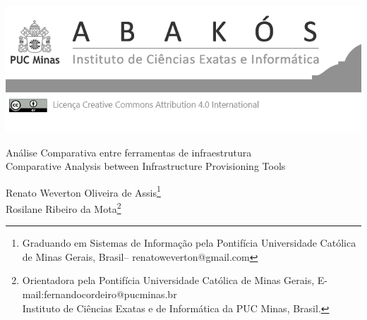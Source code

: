 \documentclass[a4paper,12pt,Times]{article}
\makeatletter
\newcommand{\monog}{Análise Comparativa entre ferramentas de infraestrutura}
\newcommand{\monogES}{Comparative Analysis between Infrastructure Provisioning Tools}
\newcommand{\origem}{Brasil}
\newcommand{\AutorA}{Renato Weverton Oliveira de Assis}
\newcommand{\funcaoA}{Graduando em Sistemas de Informação pela}
\newcommand{\emailA}{renatoweverton@gmail.com}
\newcommand{\cursA}{ Pontifícia Universidade Católica de Minas Gerais}
\newcommand{\AutorB}{Rosilane Ribeiro da Mota}
\newcommand{\funcaoB}{Orientadora pela Pontifícia Universidade Católica de Minas Gerais}
\newcommand{\emailB}{fernandocordeiro@pucminas.br}
\newcommand{\cursB}{Instituto de Ciências Exatas e de Informática da PUC Minas}
\newcommand{\keyword}[1]{\textsf{#1}}
\makeatother
\begin{document}

\begin{flushleft}

\begin{minipage} [c][5cm][b]{16.5cm} %
\includegraphics[scale=1.1]{figuras/pucmg.png} 
\end{minipage}

 \vspace{0cm} {
 \singlespacing \Large{\monog {} \\ }
  \normalsize{\monogES}
 }
\end{flushleft}
\begin{flushright}
\singlespacing 
\normalsize{\AutorA \footnote{\funcaoA \cursA, \origem -- \emailA }} \\
\normalsize{\AutorB \footnote{\funcaoB, E-mail:\emailB \\ \cursB, \origem. }} \\
\end{flushright}
\thispagestyle{empty}

\begin{abstract}
\noindent
   Infraestrutura como código, ou também conhecido como IaC é o gerenciamento de recursos em um ambiente computacional. Este gerenciamento é dado por meio de arquivos de definição para definir e implantar recursos, utilizando \textit{softwares} específicos para essa finalidade. A infraestrutura como código é adotada primordialmente na computação em nuvem permitindo um fluxo de trabalho totalmente automatizado. 
    Este trabalho trata-se de uma análise de ferramentas de provisionamento e gerenciamento de configuração.  
\\\textbf{\keyword{Palavras-chave: }}  Infraestrutura como código,Automação, Provisionamento,  Gerenciamento de configuração, Computação na nuvem Terraform, Cheff 
\end{abstract}
\end{document}
